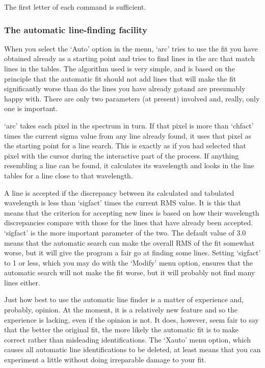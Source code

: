 The first letter of each command is sufficient.


\subsubsection{\label{techno10auto}The automatic line-finding facility}

   When you select the `Auto' option in the menu, `arc' tries to use the
   fit you have obtained already as a starting point and tries to find
   lines in the arc that match lines in the tables. The algorithm used
   is very simple, and is based on the principle that the automatic fit
   should not add lines that will make the fit significantly worse than
   do the lines you have already got\latorhtm{---}{-}and are presumably
   happy with.
   There are only two parameters (at present) involved and, really, only
   one is important.

   `arc' takes each pixel in the spectrum in turn.  If that pixel is
   more than `chfact' times the current sigma value from any line
   already found,  it uses  that pixel as the starting point for a line
   search.  This is exactly as if you had selected that pixel with the
   cursor during the interactive part of the process.  If anything
   resembling a line can be found, it calculates its wavelength and
   looks in the line tables for a line close to that wavelength.

   A line is accepted if the discrepancy between its calculated and
   tabulated wavelength is less than `sigfact' times the current RMS
   value.  It is this that means that the criterion for accepting new
   lines is based on how their wavelength discrepancies compare with
   those for the lines that have already been accepted.  `sigfact' is
   the more important parameter of the two.  The default value of 3.0
   means that the automatic search can make the overall RMS of the fit
   somewhat worse, but it will give the program a fair go at finding
   some lines.  Setting `sigfact' to 1 or less, which you may do with
   the `Modify' menu option, ensures that the automatic search will not
   make the fit worse, but it will probably not find many lines either.

   Just how best to use the automatic line finder is a matter of
   experience and, probably, opinion.  At the moment, it is a relatively
   new feature and so the experience is lacking, even if the opinion is
   not. It does, however, seem fair to say that the better the original
   fit, the more likely the automatic fit is to make correct rather than
   misleading identifications.  The `Xauto' menu option, which causes
   all automatic line identifications to be deleted, at least means that
   you can experiment a little without doing irreparable damage to your
   fit.

